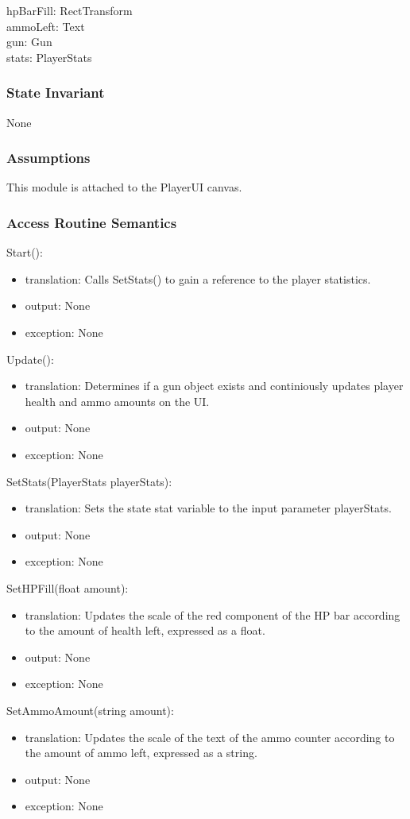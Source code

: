 \documentclass[12pt]{article}
\begin{document}
{hpBarFill: RectTransform \\
ammoLeft: Text \\
gun: Gun \\
stats: PlayerStats 

\subsubsection* {State Invariant}

None

\subsubsection* {Assumptions}

This module is attached to the PlayerUI canvas.

\subsubsection* {Access Routine Semantics}

\noindent Start():
\begin{itemize}
\item translation: Calls SetStats() to gain a reference to the player statistics.
\item output: None
\item exception: None
\end{itemize}

\noindent Update():
\begin{itemize}
\item translation: Determines if a gun object exists and continiously updates player health and ammo amounts on the UI.
\item output: None
\item exception: None
\end{itemize}

\noindent SetStats(PlayerStats playerStats):
\begin{itemize}
\item translation: Sets the state stat variable to the input parameter playerStats.
\item output: None
\item exception: None
\end{itemize}

\noindent SetHPFill(float amount):
\begin{itemize}
\item translation: Updates the scale of the red component of the HP bar according to the amount of health left, expressed as a float.
\item output: None
\item exception: None
\end{itemize}

\noindent SetAmmoAmount(string amount):
\begin{itemize}
\item translation: Updates the scale of the text of the ammo counter according to the amount of ammo left, expressed as a string.
\item output: None
\item exception: None
\end{itemize}
}
\end{document}
